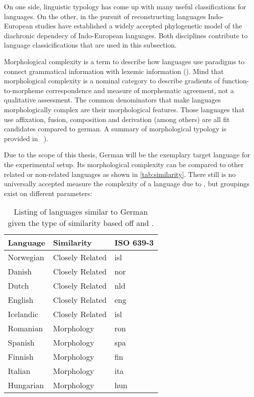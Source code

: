 On one side, linguistic typology has come up with many useful classifications for languages.
On the other, in the pursuit of reconstructing languages Indo-European studies have established a widely accepted phylogenetic model of the diachronic dependecy of Indo-European languages.
Both disciplines contribute to language classicifications that are used in this subsection.

Morphological complexity is a term to describe how languages use paradigms to connect grammatical information with lexemic information (\cite{MORPHOLOGICALCOMPLEXITY}).
Mind that morphological complexity is a nominal category to describe gradients of function-to-morpheme correspondence and measure of morphematic agreement, not a qualitative assessment.
The common denominators that make languages morphologically complex are their morphological features.
Those languages that use affixation, fusion, composition and derivation (among others) are all fit candidates compared to german.
A summary of morphological typology is provided in ~\cite*[78--93]{LINGUISTICTYPOLOGY}).

Due to the scope of this thesis, German will be the exemplary target language for the experimental setup.
Its morphological complexity can be compared to other related or non-related languages as shown in \autoref{tab:similarity}.
There still is no universally accepted measure the complexity of a language due to , but groupings exist on different parameters:
\\
\begin{table}[h]
    \centering
    \begin{tabular}{lll}
        \toprule
        \textbf{Language} & \textbf{Similarity} & \textbf{ISO 639-3} \\
        \midrule
        Norwegian & Closely Related & isl \\
        Danish & Closely Related & nor \\
        Dutch & Closely Related & nld \\
        English & Closely Related & eng \\
        Icelandic & Closely Related & isl \\
        Romanian & Morphology & ron \\
        Spanish & Morphology & spa \\
        Finnish & Morphology & fin \\
        Italian & Morphology & ita \\
        Hungarian & Morphology & hun \\
        \bottomrule
    \end{tabular}
    \caption{Listing of languages similar to German given the type of similarity based off \textcite{lehmann} and \textcite{MORPHOSYNTAXCOMPLEXITY1}.}
    \label{tab:similarity}
\end{table}

